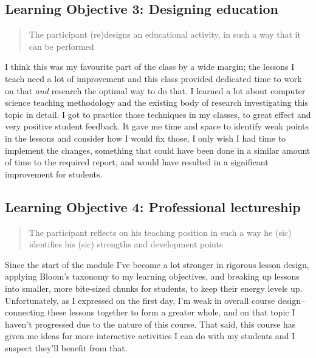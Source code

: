 \documentclass[paper=a4,justified,a4paper]{tufte-handout}
\begin{document}
\hypertarget{learning-objective-3-designing-education}{%
\subsection{Learning Objective 3: Designing
education}\label{learning-objective-3-designing-education}}

\begin{quote}
The participant (re)designs an educational activity, in such a way that
it can be performed
\end{quote}

I think this was my favourite part of the class by a wide margin; the
lessons I teach need a lot of improvement and this class provided
dedicated time to work on that \emph{and} research the optimal way to do
that. I learned a lot about computer science teaching methodology and
the existing body of research investigating this topic in detail. I got
to practice those techniques in my classes, to great effect and very
positive student feedback. It gave me time and space to identify weak
points in the lessons and consider how I would fix those, I only wish I
had time to implement the changes, something that could have been done
in a similar amount of time to the required report, and would have
resulted in a significant improvement for students.

\hypertarget{learning-objective-4-professional-lectureship}{%
\subsection{Learning Objective 4: Professional
lectureship}\label{learning-objective-4-professional-lectureship}}

\begin{quote}
The participant reflects on his teaching position in such a way he (sic)
identifies his (sic) strengths and development points
\end{quote}

Since the start of the module I've become a lot stronger in rigorous
lesson design, applying Bloom's taxonomy to my learning objectives, and
breaking up lessons into smaller, more bite-sized chunks for students,
to keep their energy levels up. Unfortunately, as I expressed on the
first day, I'm weak in overall course design--connecting these lessons
together to form a greater whole, and on that topic I haven't progressed
due to the nature of this course. That said, this course has given me
ideas for more interactive activities I can do with my students and I
suspect they'll benefit from that.
\end{document}

